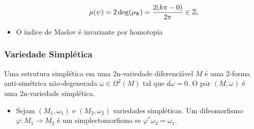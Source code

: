 \documentclass{beamer}
\begin{document}
\begin{footnotesize}
\begin{frame}
\begin{prova}
\begin{itemize}
\begin{itemize}
\begin{scriptsize}
						$$
						\mu(\psi) = 2\deg(\rho_{\Psi}) = \frac{2
							(k\pi-0)}{2\pi}\in \mathbb{Z}.$$
						
					\end{scriptsize}
				\end{itemize}
				
				\item O índice de Maslov é invariante por homotopia 
				
				\begin{itemize}
				\end{itemize}	
			\end{itemize}
			
		\end{prova}
	\end{frame}
	

	\begin{frame}
		\frametitle{Variedade Simplética}
		\begin{definicao}
			
			Uma estrutura simplética em uma 2n-variedade diferenciável $M$ é uma 2-forma anti-simétrica não-degenerada $\omega\in \Omega^{2}(M)$ tal que $d\omega=0$. O par $(M, \omega)$ é uma 2n-variedade simplética.
		\end{definicao}
		
		\begin{itemize}
			\item Sejam $(M_{1}, \omega_{1})$ e $(M_{2}, \omega_{2})$ variedades simpléticas. Um difeomorfismo $\varphi: M_1\to M_2$ é um simplectomorfismo se $\varphi^{*}\omega_{2}=\omega_{1}$.
			

\end{itemize}
\end{frame}
\end{footnotesize}
\end{document}
